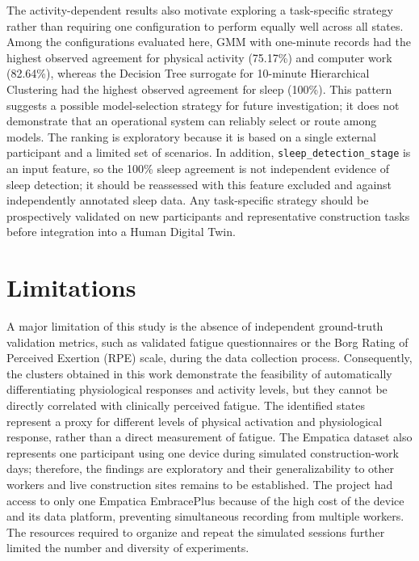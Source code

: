 \documentclass[a4paper,fleqn]{cas-sc}
\newcommand{\newtext}[1]{{\color{magenta}#1}}
\newcommand{\newtextred}[1]{{\color{yellow!65!black}#1}}
\begin{document}
\newtextred{The activity-dependent results also motivate exploring a task-specific strategy rather than requiring one configuration to perform equally well across all states. Among the configurations evaluated here, GMM with one-minute records had the highest observed agreement for physical activity (75.17\%) and computer work (82.64\%), whereas the Decision Tree surrogate for 10-minute Hierarchical Clustering had the highest observed agreement for sleep (100\%). This pattern suggests a possible model-selection strategy for future investigation; it does not demonstrate that an operational system can reliably select or route among models. The ranking is exploratory because it is based on a single external participant and a limited set of scenarios. In addition, \texttt{sleep\_detection\_stage} is an input feature, so the 100\% sleep agreement is not independent evidence of sleep detection; it should be reassessed with this feature excluded and against independently annotated sleep data. Any task-specific strategy should be prospectively validated on new participants and representative construction tasks before integration into a Human Digital Twin.}


\section{Limitations}\label{sec:limitations}

\newtext{A major limitation of this study is the absence of independent ground-truth validation metrics, such as validated fatigue questionnaires or the Borg Rating of Perceived Exertion (RPE) scale, during the data collection process. Consequently, the clusters obtained in this work demonstrate the feasibility of automatically differentiating physiological responses and activity levels, but they cannot be directly correlated with clinically perceived fatigue. The identified states represent a proxy for different levels of physical activation and physiological response, rather than a direct measurement of fatigue.}
\newtext{The Empatica dataset also represents one participant using one device during simulated construction-work days; therefore, the findings are exploratory and their generalizability to other workers and live construction sites remains to be established.}
The project had access to only one Empatica EmbracePlus because of the high cost of the device and its data platform, preventing simultaneous recording from multiple workers. The resources required to organize and repeat the simulated sessions further limited the number and diversity of experiments.
\end{document}

